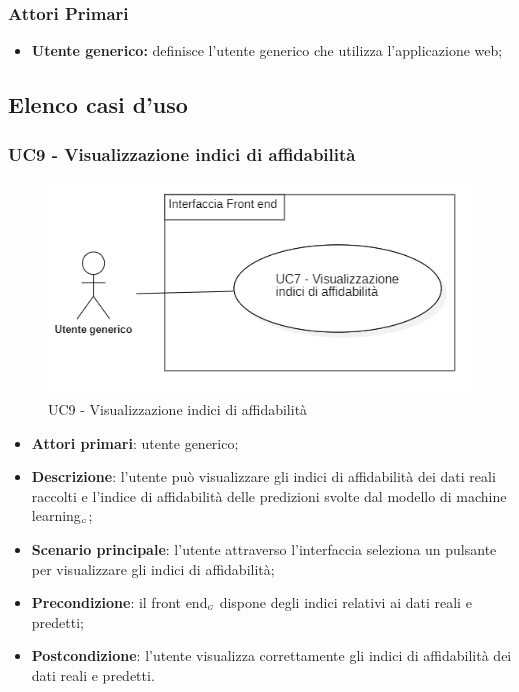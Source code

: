 \subsubsection{Attori Primari}\label{UFattoriPrimariFac}
\begin{itemize}
	\item \textbf{Utente generico:} definisce l'utente generico che utilizza l'applicazione web;
\end{itemize}

\subsection{Elenco casi d'uso}\label{CasiDUsoCasiDUsoFacoltativiTraUnUtenteEIlFrontEndElencoCasiDUso}
\subsubsection{UC9 - Visualizzazione indici di affidabilità}\label{indiciAffidabilita}
\begin{center}
	\begin{figure}[H]
		\includegraphics[scale=0.7]{../immagini/attori_casi/uc7.png}
		\caption{UC9 - Visualizzazione indici di affidabilità}
	\end{figure}
\end{center}
\begin{itemize}
	\item \textbf{Attori primari}: utente generico;
	\item \textbf{Descrizione}: l'utente può visualizzare gli indici di affidabilità dei dati reali raccolti e l'indice di affidabilità delle predizioni svolte dal modello di machine learning$_{\scaleto{G}{3pt}}$;
	\item \textbf{Scenario principale}: l'utente attraverso l'interfaccia seleziona un pulsante per visualizzare gli indici di affidabilità;
	\item \textbf{Precondizione}: il front end$_{\scaleto{G}{3pt}}$ dispone degli indici relativi ai dati reali e predetti;
	\item \textbf{Postcondizione}: l'utente visualizza correttamente gli indici di affidabilità dei dati reali e predetti. 
\end{itemize}

